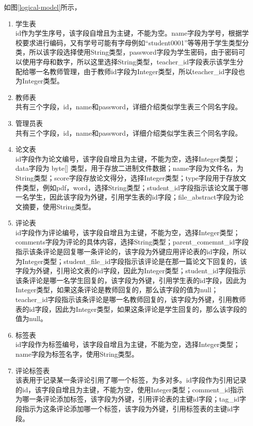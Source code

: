 如图\ref{logical-model}所示，
\begin{enumerate}
    \item 学生表\\
          id作为学生序号，该字段自增且为主键，不能为空。name字段为学号，根据学校要求进行编码，又有学号可能有字母例如“student0001”等等用于学生类型分类，所以该字段选择使用String类型，password字段为学生密码，由于密码可以使用字母和数字，所以这里选择String类型，teacher\_id字段表示该学生分配给哪一名教师管理，由于教师id字段为Integer类型，所以teacher\_id字段也为Integer类型。
    \item 教师表\\
          共有三个字段，id，name和password，详细介绍类似学生表三个同名字段。
    \item 管理员表\\
          共有三个字段，id，name和password，详细介绍类似学生表三个同名字段。
    \item 论文表\\
          id字段作为论文编号，该字段自增且为主键，不能为空，选择Integer类型；data字段为 byte[] 类型，用于存放二进制文件数据；name字段为文件名，为String类型；score字段存放论文得分，选择Integer类型；type字段用于存放文件类型，例如pdf，word，选择String类型；student\_id字段指示该论文属于哪一名学生，因此该字段为外键，引用学生表的id字段；file\_abstract字段为论文摘要，使用String类型。
    \item 评论表\\
          id字段作为评论编号，该字段自增且为主键，不能为空，选择Integer类型；comments字段为评论的具体内容，选择String类型；parent\_comemnt\_id字段指示该条评论是回复哪一条评论的，该字段为外键应用评论表的id字段，所以为Integer类型；student\_file\_id字段指示该评论是在那一篇论文下回复的，该字段为外键，引用论文表的id字段，因此为Integer类型；student\_id字段指示该条评论是哪一名学生回复的，该字段为外键，引用学生表的id字段，因此为Integer类型，如果这条评论是教师回复的，那么该字段的值为null；teacher\_id字段指示该条评论是哪一名教师回复的，该字段为外键，引用教师表的id字段，因此为Integer类型，如果这条评论是学生回复的，那么该字段的值为null。
    \item 标签表\\
          id字段作为标签编号，该字段自增且为主键，不能为空，选择Integer类型；name字段为标签名字，使用String类型。
    \item 评论标签表\\
          该表用于记录某一条评论引用了哪一个标签，为多对多。id字段作为引用记录的id，该字段自增且为主键，不能为空，使用Integer类型；comment\_id指示为哪一条评论添加标签，该字段为外键，引用评论表的主键id字段；tag\_id字段指示为这条评论添加哪一个标签，该字段为外键，引用标签表的主键id字段。
\end{enumerate}

